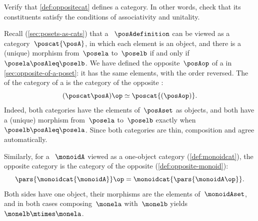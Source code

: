\vfill
\begin{gradedexercise}
    \label{ex:OppositeCat}
    Verify that \cref{def:oppositecat} defines a category.
    In other words, check that its constituents satisfy the conditions of associativity and unitality.
\end{gradedexercise}



\begin{example}
    \label{exa:opposite-cat-preorder}
    Recall (\cref{sec:posets-as-cats}) that a ~$\posAdefinition$ can be viewed as a category~$\poscat{\posA}$, in which each element is an object, and there is a (unique) morphism from~$\posela$ to~$\poselb$ if and only if~$\posela \posAleq \poselb$.
    We have defined the opposite~$\posAop$ of a  in \cref{sec:opposite-of-a-poset}: it has the same elements, with the order reversed.
    The  of the category of a  is the category of the opposite :
    \begin{equation}
        (\poscat \posA)\op \simeq \poscat{(\posAop)} .
    \end{equation}
    Indeed, both categories have the elements of~$\posAset$ as objects, and both have a (unique) morphism from~$\posela$ to~$\poselb$ exactly when~$\poselb \posAleq \posela$.
    Since both categories are thin, composition and  agree automatically.
\end{example}

\begin{example}
    \label{exa:opposite-cat-monoid}
    Similarly, for a ~$\monoidA$ viewed as a one-object category (\cref{def:monoidcat}), the opposite category is the category of the opposite  (\cref{def:opposite-monoid}):
    \begin{equation}
        \pars{\monoidcat{\monoidA}}\op = \monoidcat{\pars{\monoidA\op}}.
    \end{equation}
    Both sides have one object, their morphisms are the elements of~$\monoidAset$, and in both cases composing~$\monela$ with~$\monelb$ yields~$\monelb \mtimes \monela$.
\end{example}

